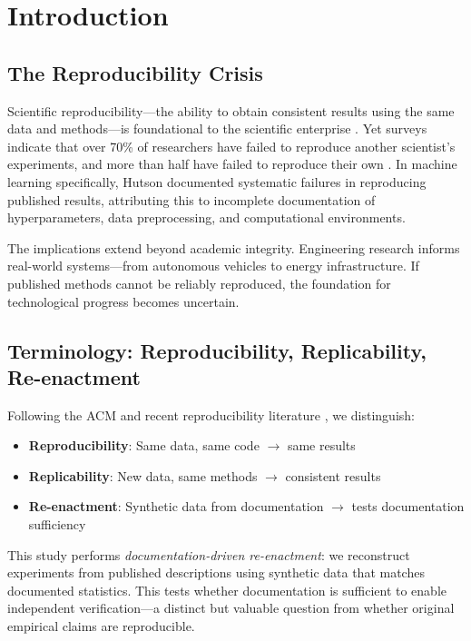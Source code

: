 \documentclass[conference]{IEEEtran}
\begin{document}
\section{Introduction}

\subsection{The Reproducibility Crisis}

Scientific reproducibility---the ability to obtain consistent results using the same data and methods---is foundational to the scientific enterprise \cite{baker2016reproducibility}. Yet surveys indicate that over 70\% of researchers have failed to reproduce another scientist's experiments, and more than half have failed to reproduce their own \cite{baker2016reproducibility}. In machine learning specifically, Hutson \cite{hutson2018artificial} documented systematic failures in reproducing published results, attributing this to incomplete documentation of hyperparameters, data preprocessing, and computational environments.

The implications extend beyond academic integrity. Engineering research informs real-world systems---from autonomous vehicles to energy infrastructure. If published methods cannot be reliably reproduced, the foundation for technological progress becomes uncertain.

\subsection{Terminology: Reproducibility, Replicability, Re-enactment}

Following the ACM and recent reproducibility literature \cite{barba2018terminologies}, we distinguish:

\begin{itemize}
    \item \textbf{Reproducibility}: Same data, same code $\rightarrow$ same results
    \item \textbf{Replicability}: New data, same methods $\rightarrow$ consistent results
    \item \textbf{Re-enactment}: Synthetic data from documentation $\rightarrow$ tests documentation sufficiency
\end{itemize}

This study performs \textit{documentation-driven re-enactment}: we reconstruct experiments from published descriptions using synthetic data that matches documented statistics. This tests whether documentation is sufficient to enable independent verification---a distinct but valuable question from whether original empirical claims are reproducible.
\end{document}
